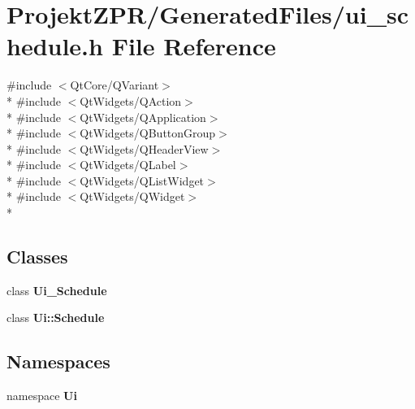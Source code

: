 \section{Projekt\-Z\-P\-R/\-Generated\-Files/ui\-\_\-schedule.h File Reference}
\label{ui__schedule_8h}
{\ttfamily \#include $<$Qt\-Core/\-Q\-Variant$>$}\\*
{\ttfamily \#include $<$Qt\-Widgets/\-Q\-Action$>$}\\*
{\ttfamily \#include $<$Qt\-Widgets/\-Q\-Application$>$}\\*
{\ttfamily \#include $<$Qt\-Widgets/\-Q\-Button\-Group$>$}\\*
{\ttfamily \#include $<$Qt\-Widgets/\-Q\-Header\-View$>$}\\*
{\ttfamily \#include $<$Qt\-Widgets/\-Q\-Label$>$}\\*
{\ttfamily \#include $<$Qt\-Widgets/\-Q\-List\-Widget$>$}\\*
{\ttfamily \#include $<$Qt\-Widgets/\-Q\-Widget$>$}\\*
\subsection*{Classes}
\begin{DoxyCompactItemize}
\item 
class {\bf Ui\-\_\-\-Schedule}
\item 
class {\bf Ui\-::\-Schedule}
\end{DoxyCompactItemize}
\subsection*{Namespaces}
\begin{DoxyCompactItemize}
\item 
namespace {\bf Ui}
\end{DoxyCompactItemize}
